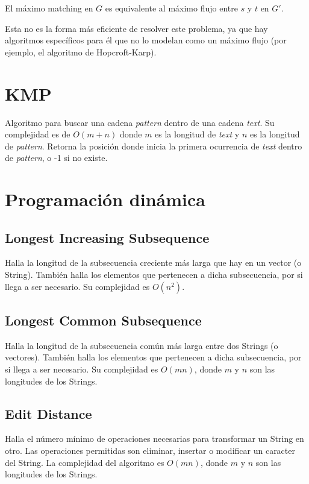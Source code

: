 \documentclass{article}
\begin{document}
\begin{multicols}{2}
	El máximo matching en \( G \) es equivalente al máximo flujo entre \( s \) y \( t \) en \( G' \).
	
	Esta no es la forma más eficiente de resolver este problema, ya que hay algoritmos específicos para él que no lo modelan como un máximo flujo (por ejemplo, el algoritmo de Hopcroft-Karp).

\section{KMP}
Algoritmo para buscar una cadena \emph{pattern} dentro de una cadena \emph{text}. Su complejidad es de \( O(m+n) \) donde \( m \) es la longitud de \emph{text} y \( n \) es la longitud de \emph{pattern}. Retorna la posición donde inicia la primera ocurrencia de \emph{text} dentro de \emph{pattern}, o -1 si no existe.


\section{Programación dinámica}
	\subsection{Longest Increasing Subsequence}
		Halla la longitud de la subsecuencia creciente más larga que hay en un vector (o String). También halla los elementos que pertenecen a dicha subsecuencia, por si llega a ser necesario. Su complejidad es \( O(n^2) \).
		
		
	\subsection{Longest Common Subsequence}
		Halla la longitud de la subsecuencia común más larga entre dos Strings (o vectores). También halla los elementos que pertenecen a dicha subsecuencia, por si llega a ser necesario. Su complejidad es \( O(mn) \), donde \( m \) y \( n \) son las longitudes de los Strings.
		
	
	\subsection{Edit Distance}
	Halla el número mínimo de operaciones necesarias para transformar un String en otro. Las operaciones permitidas son eliminar, insertar o modificar un caracter	del String. La complejidad del algoritmo es \( O(mn) \), donde \( m \) y \( n \) son las longitudes de los Strings.
	
	

\end{multicols}
\end{document}
